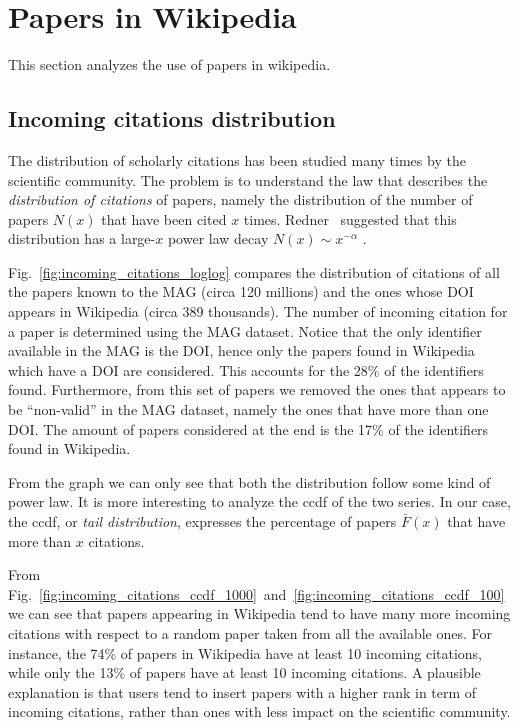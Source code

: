\section{Papers in Wikipedia}
This section analyzes the use of papers in wikipedia.

\subsection{Incoming citations distribution}
The distribution of scholarly citations has been studied many times by the scientific community.
The problem is to understand the law that describes the \emph{distribution of citations} of papers, namely the distribution of the number of papers $N(x)$ that have been cited $x$ times.
Redner~\cite{Redner1998} suggested that this distribution has a large-$x$ power law decay $N(x) \sim x^{-\alpha}$ .

Fig.~\ref{fig:incoming_citations_loglog} compares the distribution of citations of all the papers known to the MAG (circa 120 millions) and the ones whose \ac{DOI} appears in Wikipedia (circa 389 thousands).
The number of incoming citation for a paper is determined using the \ac{MAG} dataset.
Notice that the only identifier available in the \ac{MAG} is the \ac{DOI}, hence only the papers found in Wikipedia which have a \ac{DOI} are considered.
This accounts for the 28\% of the identifiers found.
Furthermore, from this set of papers we removed the ones that appears to be ``non-valid'' in the \ac{MAG} dataset, namely the ones that have more than one \ac{DOI}.
The amount of papers considered at the end is the 17\% of the identifiers found in Wikipedia.

From the graph we can only see that both the distribution follow some kind of power law.
It is more interesting to analyze the \ac{ccdf} of the two series.
In our case, the \ac{ccdf}, or \emph{tail distribution}, expresses the percentage of papers $\bar{F}(x)$ that have more than $x$ citations.

From Fig.~\ref{fig:incoming_citations_ccdf_1000}~and~\ref{fig:incoming_citations_ccdf_100} we can see that papers appearing in Wikipedia tend to have many more incoming citations with respect to a random paper taken from all the available ones.
For instance, the 74\% of papers in Wikipedia have at least 10 incoming citations, while only the 13\% of papers have at least 10 incoming citations.
A plausible explanation is that users tend to insert papers with a higher rank in term of incoming citations, rather than ones with less impact on the scientific community.


